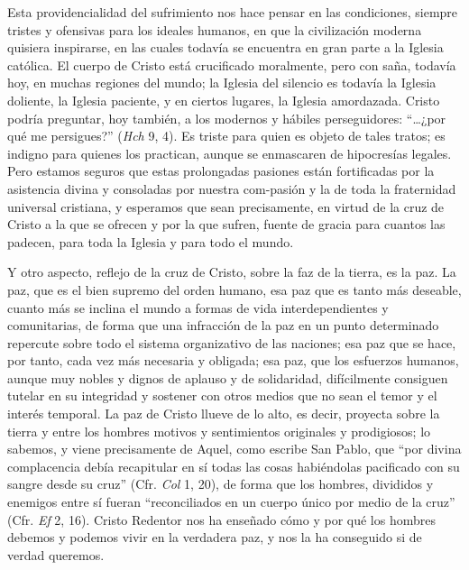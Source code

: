			\begin{body}Esta providencialidad del sufrimiento nos hace pensar en las condiciones, siempre tristes y ofensivas para los ideales humanos, en que la civilización moderna quisiera inspirarse, en las cuales todavía se encuentra en gran parte a la Iglesia católica. El cuerpo de Cristo está crucificado moralmente, pero con saña, todavía hoy, en muchas regiones del mundo; la Iglesia del silencio es todavía la Iglesia doliente, la Iglesia paciente, y en ciertos lugares, la Iglesia amordazada. Cristo podría preguntar, hoy también, a los modernos y hábiles perseguidores: “…¿por qué me persigues?” (\textit{Hch} 9, 4). Es triste para quien es objeto de tales tratos; es indigno para quienes los practican, aunque se enmascaren de hipocresías legales. Pero estamos seguros que estas prolongadas pasiones están fortificadas por la asistencia divina y consoladas por nuestra com-pasión y la de toda la fraternidad universal cristiana, y esperamos que sean precisamente, en virtud de la cruz de Cristo a la que se ofrecen y por la que sufren, fuente de gracia para cuantos las padecen, para toda la Iglesia y para todo el mundo.\end{body}
			
			\begin{body}Y otro aspecto, reflejo de la cruz de Cristo, sobre la faz de la tierra, es la paz. La paz, que es el bien supremo del orden humano, esa paz que es tanto más deseable, cuanto más se inclina el mundo a formas de vida interdependientes y comunitarias, de forma que una infracción de la paz en un punto determinado repercute sobre todo el sistema organizativo de las naciones; esa paz que se hace, por tanto, cada vez más necesaria y obligada; esa paz, que los esfuerzos humanos, aunque muy nobles y dignos de aplauso y de solidaridad, difícilmente consiguen tutelar en su integridad y sostener con otros medios que no sean el temor y el interés temporal. La paz de Cristo llueve de lo alto, es decir, proyecta sobre la tierra y entre los hombres motivos y sentimientos originales y prodigiosos; lo sabemos, y viene precisamente de Aquel, como escribe San Pablo, que “por divina complacencia debía recapitular en sí todas las cosas habiéndolas pacificado con su sangre desde su cruz” (Cfr. \textit{Col} 1, 20), de forma que los hombres, divididos y enemigos entre sí fueran “reconciliados en un cuerpo único por medio de la cruz” (Cfr. \textit{Ef} 2, 16). Cristo Redentor nos ha enseñado cómo y por qué los hombres debemos y podemos vivir en la verdadera paz, y nos la ha conseguido si de verdad queremos.\end{body}
			

